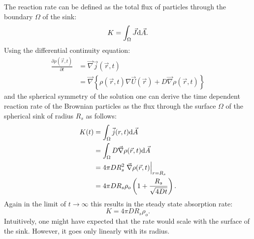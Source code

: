 The reaction rate can be defined as the total flux of particles through the boundary $\Omega$ of the sink:
\begin{equation}
    K = \int_\Omega \vec{J} {\rm d}\vec{A} .
    \label{reaction rate}
\end{equation}
Using the differential continuity equation:
\begin{align}
    \frac{\partial \rho(\vec{r},t)}{\partial t}&= \vec{\nabla} \vec{j}(\vec{r},t) \nonumber \\
    &= \vec{\nabla} \left\{ \rho(\vec{r},t) \nabla \vec{U}(\vec{r}) + D \vec{\nabla} \rho(\vec{r},t) \right\}
    \label{contiuity_equation}
\end{align}
and the spherical symmetry of the solution one can derive the time dependent reaction rate of the Brownian particles as the flux through the surface $\Omega$ of the spherical sink of radius $R_s$ as follows:
\begin{align}
    K(t) &= \int_\Omega \vec j(r,t) {\rm d} \vec A \nonumber \\
    &= \int_\Omega D  \vec{\nabla} \rho(\vec{r},t) {\rm d} \vec{A} \nonumber \\
    &= 4 \pi D R_s^2 \left. \vec{\nabla} \rho(\vec{r},t) \right|_{r = R_s} \nonumber \\
    &= 4 \pi D R_s \rho_o \left( 1 + \frac{R_s}{\sqrt{4Dt}} \right).
    \label{ideal reaction rate}
\end{align}
Again in the limit of $t \rightarrow \infty$ this results in the steady state absorption rate:
\begin{equation}
    K = 4 \pi D R_s \rho_o.
    \label{steady state ideal rate}
\end{equation}
Intuitively, one might have expected that the rate would scale with the surface of the sink. However, it goes only linearly with its radius.
